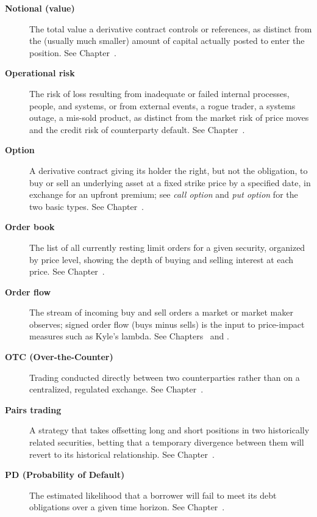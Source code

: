 \documentclass[../ai_in_finance]{subfiles}
\begin{document}
\begin{description}
\item[\textbf{Notional (value)}] The total value a derivative contract controls or references, as distinct from the (usually much smaller) amount of capital actually posted to enter the position. See Chapter~.

\item[\textbf{Operational risk}] The risk of loss resulting from inadequate or failed internal processes, people, and systems, or from external events, a rogue trader, a systems outage, a mis-sold product, as distinct from the market risk of price moves and the credit risk of counterparty default. See Chapter~.

\item[\textbf{Option}] A derivative contract giving its holder the right, but not the obligation, to buy or sell an underlying asset at a fixed strike price by a specified date, in exchange for an upfront premium; see \emph{call option} and \emph{put option} for the two basic types. See Chapter~.

\item[\textbf{Order book}] The list of all currently resting limit orders for a given security, organized by price level, showing the depth of buying and selling interest at each price. See Chapter~.

\item[\textbf{Order flow}] The stream of incoming buy and sell orders a market or market maker observes; signed order flow (buys minus sells) is the input to price-impact measures such as Kyle's lambda. See Chapters~ and .

\item[\textbf{OTC (Over-the-Counter)}] Trading conducted directly between two counterparties rather than on a centralized, regulated exchange. See Chapter~.

\item[\textbf{Pairs trading}] A strategy that takes offsetting long and short positions in two historically related securities, betting that a temporary divergence between them will revert to its historical relationship. See Chapter~.

\item[\textbf{PD (Probability of Default)}] The estimated likelihood that a borrower will fail to meet its debt obligations over a given time horizon. See Chapter~.



\end{description}
\end{document}
